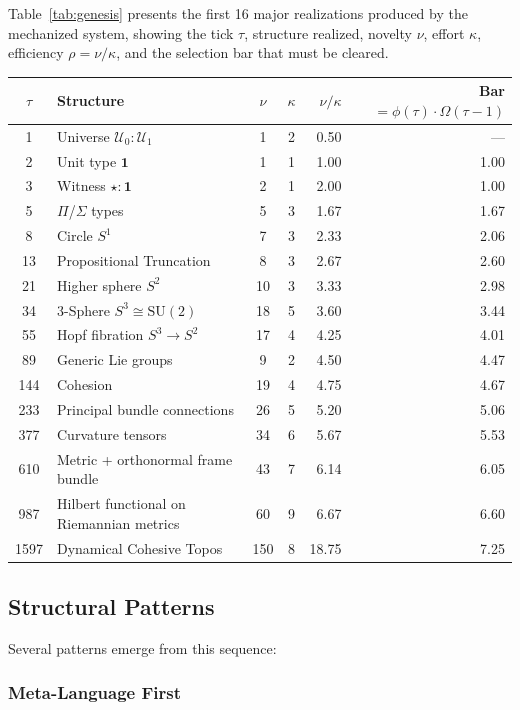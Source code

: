 \documentclass[11pt]{article}
\theoremstyle{definition}
\theoremstyle{plain}
\theoremstyle{remark}
\begin{document}
Table~\ref{tab:genesis} presents the first 16 major realizations produced by the mechanized system, showing the tick $\tau$, structure realized, novelty $\nu$, effort $\kappa$, efficiency $\rho = \nu/\kappa$, and the selection bar that must be cleared.

\label{tab:genesis}
\begin{tabular}{|c|l|c|c|r|r|}
\hline
$\tau$ & Structure & $\nu$ & $\kappa$ & $\nu/\kappa$ & Bar $= \phi(\tau) \cdot \Omega(\tau-1)$ \\
\hline
1 & Universe $\mathcal{U}_0 : \mathcal{U}_1$ & 1 & 2 & 0.50 & --- \\
2 & Unit type $\mathbf{1}$ & 1 & 1 & 1.00 & 1.00 \\
3 & Witness $\star : \mathbf{1}$ & 2 & 1 & 2.00 & 1.00 \\
5 & $\Pi$/$\Sigma$ types & 5 & 3 & 1.67 & 1.67 \\
8 & Circle $S^1$ & 7 & 3 & 2.33 & 2.06 \\
13 & Propositional Truncation & 8 & 3 & 2.67 & 2.60 \\
21 & Higher sphere $S^2$ & 10 & 3 & 3.33 & 2.98 \\
34 & $3$-Sphere $S^3 \cong \mathrm{SU}(2)$ & 18 & 5 & 3.60 & 3.44 \\
55 & Hopf fibration $S^3 \to S^2$ & 17 & 4 & 4.25 & 4.01 \\
89 & Generic Lie groups & 9 & 2 & 4.50 & 4.47 \\
144 & Cohesion & 19 & 4 & 4.75 & 4.67 \\
233 & Principal bundle connections & 26 & 5 & 5.20 & 5.06 \\
377 & Curvature tensors & 34 & 6 & 5.67 & 5.53 \\
610 & Metric + orthonormal frame bundle & 43 & 7 & 6.14 & 6.05 \\
987 & Hilbert functional on Riemannian metrics & 60 & 9 & 6.67 & 6.60 \\
1597 & Dynamical Cohesive Topos & 150 & 8 & 18.75 & 7.25 \\
\hline
\end{tabular}


\subsection{Structural Patterns}

Several patterns emerge from this sequence:

\subsubsection{Meta-Language First}
\end{document}
